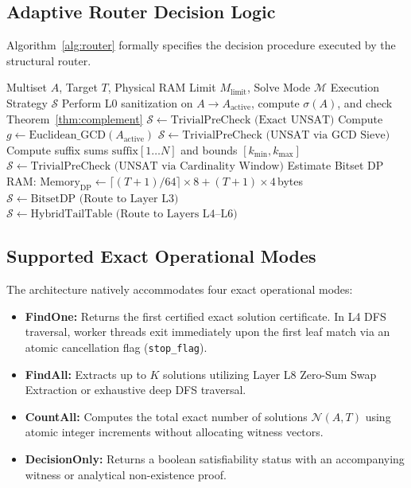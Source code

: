 \documentclass[journal,onecolumn,11pt]{IEEEtran}
\begin{document}
\subsection{Adaptive Router Decision Logic}
Algorithm~\ref{alg:router} formally specifies the decision procedure executed by the structural router.

\begin{algorithm}[h]
\caption{Adaptive Structural Router Dispatch}
\label{alg:router}
\begin{algorithmic}[1]
\REQUIRE Multiset $A$, Target $T$, Physical RAM Limit $M_{\text{limit}}$, Solve Mode $\mathcal{M}$
\ENSURE Execution Strategy $\mathcal{S}$
\STATE Perform L0 sanitization on $A \to A_{\text{active}}$, compute $\sigma(A)$, and check Theorem~\ref{thm:complement}
    \RETURN $\mathcal{S} \leftarrow \text{TrivialPreCheck (Exact UNSAT)}$
\ENDIF
\STATE Compute $g \leftarrow \text{Euclidean\_GCD}(A_{\text{active}})$
    \RETURN $\mathcal{S} \leftarrow \text{TrivialPreCheck (UNSAT via GCD Sieve)}$
\ENDIF
\STATE Compute suffix sums $\text{suffix}[1 \dots N]$ and bounds $[k_{\min}, k_{\max}]$
    \RETURN $\mathcal{S} \leftarrow \text{TrivialPreCheck (UNSAT via Cardinality Window)}$
\ENDIF
\STATE Estimate Bitset DP RAM: $\text{Memory}_{\text{DP}} \leftarrow \lceil (T+1)/64 \rceil \times 8 + (T+1) \times 4$\,bytes
    \RETURN $\mathcal{S} \leftarrow \text{BitsetDP (Route to Layer L3)}$
\ELSE
    \RETURN $\mathcal{S} \leftarrow \text{HybridTailTable (Route to Layers L4--L6)}$
\ENDIF
\end{algorithmic}
\end{algorithm}

\subsection{Supported Exact Operational Modes}
The architecture natively accommodates four exact operational modes:
\begin{itemize}
    \item \textbf{FindOne:} Returns the first certified exact solution certificate. In L4 DFS traversal, worker threads exit immediately upon the first leaf match via an atomic cancellation flag (\texttt{stop\_flag}).
    \item \textbf{FindAll:} Extracts up to $K$ solutions utilizing Layer L8 Zero-Sum Swap Extraction or exhaustive deep DFS traversal.
    \item \textbf{CountAll:} Computes the total exact number of solutions $\mathcal{N}(A, T)$ using atomic integer increments without allocating witness vectors.
    \item \textbf{DecisionOnly:} Returns a boolean satisfiability status with an accompanying witness or analytical non-existence proof.
\end{itemize}
\end{document}
